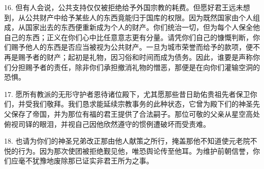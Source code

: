 16. 但有人会说，公共支持仅仅被拒绝给予外国宗教的耗费。但愿好君王远未想到，从公共财产中给予某些人的东西竟能归于国库的权限。因为既然国家由个人组成，从国家出去的东西便重新成为个人的财产。你们统治一切，但为每个人保全他自己的东西；正义在你们心中比任意意志更有分量。请凭你们自己的慷慨判断，你们赐予他人的东西是否应当被视为公共财产。一旦为城市荣誉而给予的款项，便不再是赐予者的财产；起初是礼物，因习俗和时间而成为债务。因此，谁要是声称你们分担赐予者的责任，除非你们承担撤消礼物的憎恶，那便是在向你们灌输空洞的恐惧。\par

17. 愿所有教派的无形守护者恩待诸位殿下，尤其愿那些昔日助佑贵祖先者保卫你们，并受我们敬拜。我们恳求能延续宗教事务的此种状态，它曾为殿下们的神圣先父保存了帝国，并为那位有福的君王提供了合法嗣子。那位可敬的父亲从星空高处俯视司铎的眼泪，并视自己因他欣然遵守的惯例遭破坏而受责难。\par

18. 也请为你们的神圣兄弟改正那由他人献策之所行，掩盖那他不知道使元老院不悦的行为。因为那次使团被拒绝觐见他，唯恐舆论传至他耳。为维护前朝信誉，你们应毫不犹豫地废除那已证实非君王所为之事。\par

